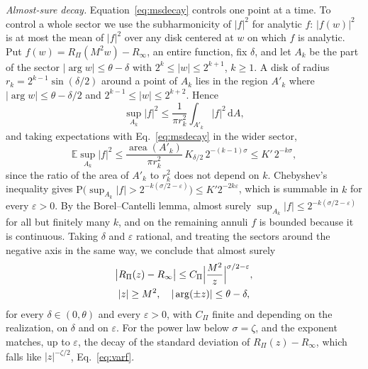 \documentclass[a4paper,11pt]{article}
\newcommand{\bE}{\mathbb{E}}
\newcommand{\dd}{\mathrm{d}}
\begin{document}
\textit{Almost-sure decay.} Equation~\eqref{eq:msdecay} controls one point at a time. To control a whole sector we use the subharmonicity of $|f|^2$ for analytic $f$: $|f(w)|^2$ is at most the mean of $|f|^2$ over any disk centered at $w$ on which $f$ is analytic. Put $f(w)=R_\Pi(M^2w)-R_\infty$, an entire function, fix $\delta$, and let $A_k$ be the part of the sector $|\arg w|\le\theta-\delta$ with $2^k\le|w|\le2^{k+1}$, $k\ge1$. A disk of radius $r_k=2^{k-1}\sin(\delta/2)$ around a point of $A_k$ lies in the region $A'_k$ where $|\arg w|\le\theta-\delta/2$ and $2^{k-1}\le|w|\le2^{k+2}$. Hence
\[
\sup_{A_k}|f|^2\le\frac1{\pi r_k^2}\int_{A'_k}|f|^2\,\dd A ,
\]
and taking expectations with Eq.~\eqref{eq:msdecay} in the wider sector,
\[
\bE\sup_{A_k}|f|^2\le\frac{\operatorname{area}(A'_k)}{\pi r_k^2}\,K_{\delta/2}\,2^{-(k-1)\sigma}\le K'\,2^{-k\sigma},
\]
since the ratio of the area of $A'_k$ to $r_k^2$ does not depend on $k$. Chebyshev's inequality gives $\mathrm P\bigl(\sup_{A_k}|f|>2^{-k(\sigma/2-\varepsilon)}\bigr)\le K'2^{-2k\varepsilon}$, which is summable in $k$ for every $\varepsilon>0$. By the Borel--Cantelli lemma, almost surely $\sup_{A_k}|f|\le2^{-k(\sigma/2-\varepsilon)}$ for all but finitely many $k$, and on the remaining annuli $f$ is bounded because it is continuous. Taking $\delta$ and $\varepsilon$ rational, and treating the sectors around the negative axis in the same way, we conclude that almost surely
\begin{equation}
\label{eq:asdecay}
\begin{gathered}
\bigl|R_\Pi(z)-R_\infty\bigr|\le C_\Pi\Bigl|\frac{M^2}z\Bigr|^{\sigma/2-\varepsilon},\\
|z|\ge M^2,\quad|\arg(\pm z)|\le\theta-\delta ,
\end{gathered}
\end{equation}
for every $\delta\in(0,\theta)$ and every $\varepsilon>0$, with $C_\Pi$ finite and depending on the realization, on $\delta$ and on $\varepsilon$. For the power law below $\sigma=\zeta$, and the exponent matches, up to $\varepsilon$, the decay of the standard deviation of $R_\Pi(z)-R_\infty$, which falls like $|z|^{-\zeta/2}$, Eq.~\eqref{eq:varf}.
\end{document}
